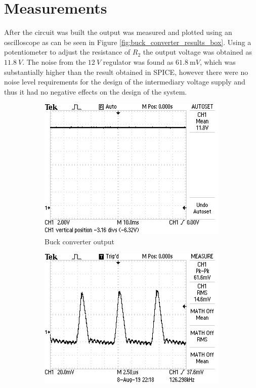 \section{Measurements} \label{sec:measurements_switchmode}
After the circuit was built the output was measured and plotted using an oscilloscope as can be seen in Figure \ref{fig:buck_converter_results_box}. Using a potentiometer to adjust the resistance of $R_{2}$ the output voltage was obtained as $\SI{11.8}{V}$. The noise from the $\SI{12}{V}$ regulator was found as $\SI{61.8}{\milli V}$, which was substantially higher than the result obtained in SPICE, however there were no noise level requirements for the design of the intermediary voltage supply and thus it had no negative effects on the design of the system. 

\begin{figure}
 \centering
     \begin{subfigure}[]{0.45\textwidth}
        \centering
         \includegraphics[width=1\linewidth]{./Figures/12V_output_voltage.JPG}
		    \caption{Buck converter output} \label{subfig:24V}
     \end{subfigure}
      \begin{subfigure}[]{0.45\textwidth}
              \centering
\includegraphics[width=1\linewidth]{./Figures/12V_output_noise.JPG}%

\end{subfigure}
\end{figure}
